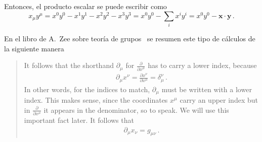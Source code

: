 Entonces, el producto escalar se puede escribir como
\begin{equation}
  x_\mu y^\mu=x^0y^0-x^1y^1-x^2y^2-x^3y^3=x^0y^0-\sum_{i}x^i y^i=x^0y^0-\boldsymbol{x}\cdot \boldsymbol{y}\,.
\end{equation}





En el libro de A.~Zee sobre teoría de grupos~\cite{Zee:2016fuk} se resumen este tipo de cálculos de la siguiente manera
\begin{quote}
  It follows that the shorthand $\partial_{\mu}$  for  $\frac{\partial}{\partial x^{\mu}}$  has to carry a lower index, because
  \begin{align}
  {\partial_{\mu} x^{\nu}=\frac{\partial x^{\nu}}{\partial x^{\mu}}=\delta_{\mu}^{\nu}}\,.  
  \end{align}
  In other words, for the indices to match, $\partial_{\mu}$  must be written with a lower index. This makes sense, since the coordinates $x^{\mu}$
  carry an upper index but in $\frac{\partial}{\partial x^{\mu}}$  it appears in the denominator, so to speak.
  We will use this important fact later. It follows that
  \begin{align}
  {\partial_{\mu} x_{\nu}=g_{\mu \nu}}\,.  
  \end{align}
\end{quote}




